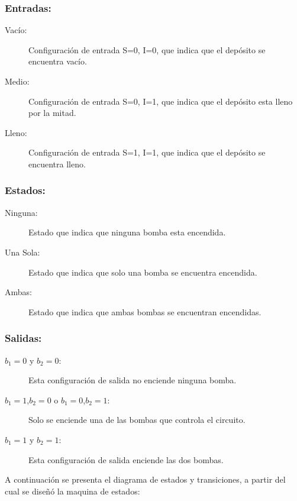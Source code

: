 \documentclass[10pt,a4paper]{article}
\begin{document}
\subsubsection*{Entradas:}

\begin{description}
\item[Vacío:] Configuración de entrada S=0, I=0, que indica que el depósito se encuentra vacío.
\item[Medio:] Configuración de entrada S=0, I=1, que indica que el depósito esta lleno por la mitad.
\item[Lleno:] Configuración de entrada S=1, I=1, que indica que el depósito se encuentra lleno.
\end{description}

\subsubsection*{Estados:}

\begin{description}
\item[Ninguna:] Estado que indica que ninguna bomba esta encendida.
\item[Una Sola:] Estado que indica que solo una bomba se encuentra encendida.
\item[Ambas:] Estado que indica que ambas bombas se encuentran encendidas.
\end{description}

\subsubsection*{Salidas:}

\begin{description}
\item[$b_1=0$ y $b_2=0$:] Esta configuración de salida no enciende ninguna bomba.
\item[$b_1=1$,$b_2=0$ o $b_1=0$,$b_2=1$:] Solo se enciende una de las bombas que controla el circuito.
\item[$b_1=1$ y $b_2=1$:] Esta configuración de salida enciende las dos bombas.
\end{description}

A continuación se presenta el diagrama de estados y transiciones, a partir del cual se diseñó la maquina de estados:
\end{document}
